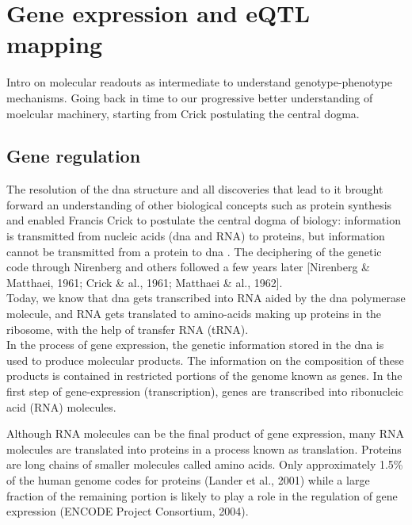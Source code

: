 \newpage

\section{Gene expression and eQTL mapping}  %

Intro on molecular readouts as intermediate to understand genotype-phenotype mechanisms.
Going back in time to our progressive better understanding of moelcular machinery, starting from Crick postulating the central dogma.

\subsection{Gene regulation}

The resolution of the \gls{dna} structure and all discoveries that lead to it brought forward an understanding of other biological concepts such as protein synthesis and enabled Francis Crick to postulate the central dogma of biology: information is transmitted from nucleic acids (\gls{dna} and RNA) to proteins, but information cannot be transmitted from a protein to \gls{dna} \cite{crick1958protein}. 
The deciphering of the genetic code through Nirenberg and others followed a few years later [Nirenberg \& Matthaei, 1961; Crick \& al., 1961; Matthaei \& al., 1962].\\

Today, we know that \gls{dna} gets transcribed into RNA aided by the \gls{dna} polymerase molecule, and RNA gets translated to amino-acids making up proteins in the ribosome, with the help of transfer RNA (tRNA).\\

In the process of gene expression, the genetic information stored in the \gls{dna} is used to produce molecular products. 
The information on the composition of these products is contained in restricted portions of the genome known as genes. 
In the first step of gene-expression (transcription), genes are transcribed into ribonucleic acid (RNA) molecules. 

Although RNA molecules can be the final product of gene expression, many RNA molecules are translated into proteins in a process known as translation. 
Proteins are long chains of smaller molecules called amino acids. 
Only approximately 1.5\% of the human genome codes for proteins (Lander et al., 2001) while a large fraction of the remaining portion is likely to play a role in the regulation of gene expression (ENCODE Project Consortium, 2004). 

